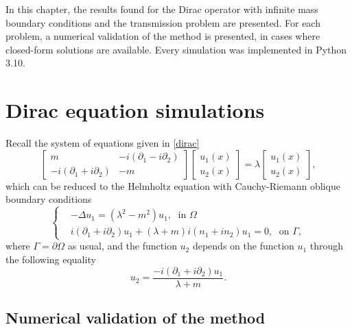 \label{chap:implement}

In this chapter, the results found for the Dirac operator with infinite mass boundary conditions and the transmission problem are presented. For each problem, a numerical validation of the method is presented, in cases where closed-form solutions are available. Every simulation was implemented in Python 3.10.

\section{Dirac equation simulations}\label{dirac_equation_simulations}

Recall the system of equations given in \eqref{dirac}
\begin{equation}\label{chapt_num_dirac_eq}
    \begin{bmatrix}
        m & -i(\partial_1 - i \partial_2)\\
        -i(\partial_1 + i \partial_2) & -m
    \end{bmatrix}
    \begin{bmatrix}
        u_1(x)\\
        u_2(x)
    \end{bmatrix}
    =\lambda
    \begin{bmatrix}
    u_1(x)\\
    u_2(x)
    \end{bmatrix},
\end{equation}
which can be reduced to the Helmholtz equation with Cauchy-Riemann oblique boundary conditions
\begin{equation*}
    \begin{cases}
        &-\Delta u_1 = (\lambda^2 - m^2)u_1, \; \text{ in } \Omega\\
        & i (\partial_1 + i\partial_2)u_1 + (\lambda + m)i(n_1 + i n_2)u_1 = 0, \; \text{ on } \Gamma,
    \end{cases}      
\end{equation*}
where \(\Gamma = \partial\Omega\) as usual, and the function \(u_2\) depends on the function \(u_1\) through the following equality
\[
    u_2 = \frac{-i (\partial_1 + i\partial_2)u_1}{\lambda + m}.    
\]
\subsection{Numerical validation of the method}

